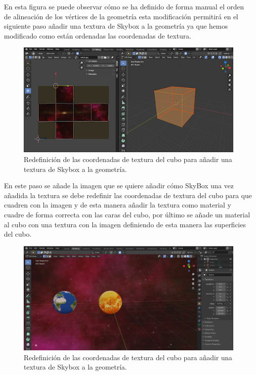 \documentclass[a4paper, 17pt]{book}
\begin{document}
En esta figura se puede observar cómo se ha definido de forma manual el orden de alineación de los vértices de la geometría esta
modificación permitirá en el siguiente paso añadir una textura de Skybox a la geometría ya que hemos modificado como están
ordenadas las coordenadas de textura.

\begin{figure}[H]
    \centering
    \includegraphics[scale=0.65, keepaspectratio]{img/SkyBoxVertex.png}
    \caption{Redefinición de las coordenadas de textura del cubo para añadir una textura de Skybox a la geometría.}
    \label{figura:materialesBlender}
\end{figure}

En este paso se añade la imagen que se quiere añadir cómo SkyBox una vez añadida la textura se debe redefinir las coordenadas
de textura del cubo para que cuadren con la imagen y de esta manera añadir la textura como material y cuadre de forma correcta
con las caras del cubo, por último se añade un material al cubo con una textura con la imagen definiendo de esta manera las
superficies del cubo.

\begin{figure}[H]
    \centering
    \includegraphics[scale=0.25, keepaspectratio]{img/SkyBoxFinal.png}
    \caption{Redefinición de las coordenadas de textura del cubo para añadir una textura de Skybox a la geometría.}
    \label{figura:materialesBlender}
\end{figure}
\end{document}
